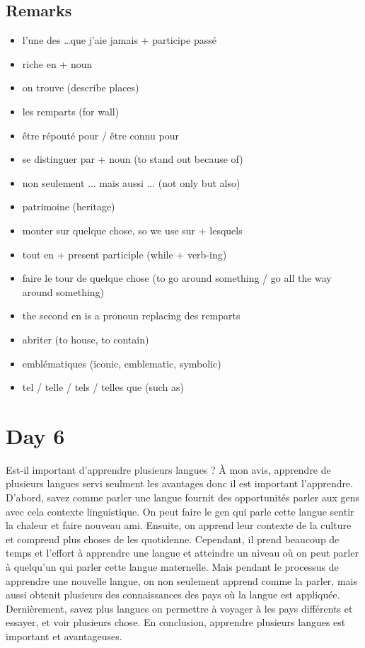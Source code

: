 \documentclass{book}
\begin{document}
    \subsection{Remarks}
        \begin{itemize}
            \item l'une des \dots que j'aie jamais + participe passé
            \item riche en + noun
            \item on trouve (describe places)
            \item les remparts (for wall)
            \item être répouté pour / être connu pour
            \item se distinguer par + noun (to stand out because of)
            \item non seulement ... mais aussi ... (not only but also)
            \item patrimoine (heritage)
            \item monter sur quelque chose, so we use sur + lesquels
            \item tout en + present participle (while + verb-ing)
            \item faire le tour de quelque chose (to go around something / go all the way around something)
            \item the second en is a pronoun replacing des remparts
            \item abriter (to house, to contain)
            \item emblématiques (iconic, emblematic, symbolic)
            \item tel / telle / tels / telles que (such as)
        \end{itemize}

\section{Day 6}
    Est-il important d'apprendre plusieurs langues ?
    À mon avis, apprendre de plusieurs langues servi seulment les avantages donc il est important l'apprendre.
    D'abord, savez comme parler une langue fournit des opportunités parler aux gens avec cela contexte linguistique. 
    On peut faire le gen qui parle cette langue sentir la chaleur et faire nouveau ami.
    Ensuite, on apprend leur contexte de la culture et comprend plus choses de les quotidenne.
    Cependant, il prend beaucoup de temps et l'effort à apprendre une langue et atteindre un niveau où on peut parler à quelqu'un qui parler cette langue maternelle.
    Mais pendant le processus de apprendre une nouvelle langue, on non seulement apprend comme la parler, mais aussi obtenit plusieurs des connaissances des pays où la langue est appliquée.
    Dernièrement, savez plus langues on permettre à voyager à les pays différents et essayer, et voir plusieurs chose.
    En conclusion, apprendre plusieurs langues est important et avantageuses.
\end{document}
